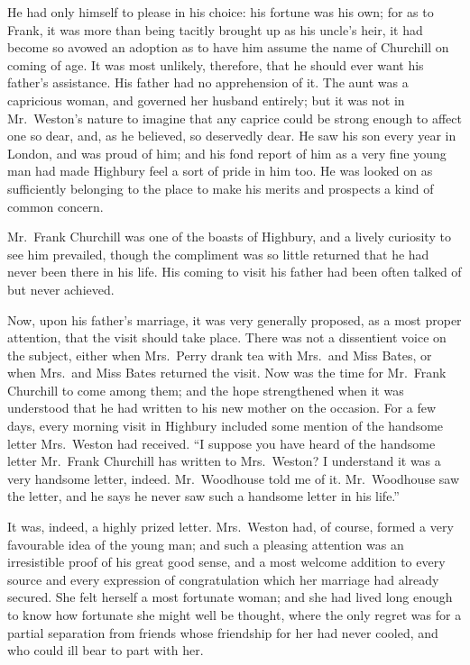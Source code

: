 He had only himself to please in his choice: his fortune was
his own; for as to Frank, it was more than being tacitly brought
up as his uncle's heir, it had become so avowed an adoption
as to have him assume the name of Churchill on coming of age.
It was most unlikely, therefore, that he should ever want his
father's assistance.  His father had no apprehension of it.
The aunt was a capricious woman, and governed her husband entirely;
but it was not in Mr.\ Weston's nature to imagine that any caprice
could be strong enough to affect one so dear, and, as he believed,
so deservedly dear.  He saw his son every year in London,
and was proud of him; and his fond report of him as a very fine
young man had made Highbury feel a sort of pride in him too.
He was looked on as sufficiently belonging to the place to make his
merits and prospects a kind of common concern.

Mr.\ Frank Churchill was one of the boasts of Highbury, and a lively
curiosity to see him prevailed, though the compliment was so little
returned that he had never been there in his life.  His coming
to visit his father had been often talked of but never achieved.

Now, upon his father's marriage, it was very generally proposed,
as a most proper attention, that the visit should take place.
There was not a dissentient voice on the subject, either when
Mrs.\ Perry drank tea with Mrs.\ and Miss Bates, or when Mrs.\ and
Miss Bates returned the visit.  Now was the time for Mr.\ Frank
Churchill to come among them; and the hope strengthened when it was
understood that he had written to his new mother on the occasion.
For a few days, every morning visit in Highbury included some mention
of the handsome letter Mrs.\ Weston had received.  ``I suppose you
have heard of the handsome letter Mr.\ Frank Churchill has written
to Mrs.\ Weston? I understand it was a very handsome letter, indeed.
Mr.\ Woodhouse told me of it.  Mr.\ Woodhouse saw the letter, and he
says he never saw such a handsome letter in his life.''

It was, indeed, a highly prized letter.  Mrs.\ Weston had, of course,
formed a very favourable idea of the young man; and such a pleasing
attention was an irresistible proof of his great good sense,
and a most welcome addition to every source and every expression
of congratulation which her marriage had already secured.  She felt
herself a most fortunate woman; and she had lived long enough
to know how fortunate she might well be thought, where the only
regret was for a partial separation from friends whose friendship
for her had never cooled, and who could ill bear to part with her.

